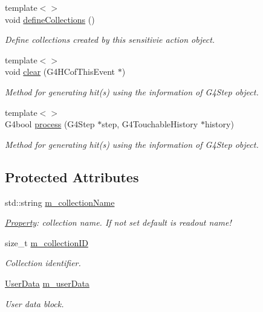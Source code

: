 \begin{DoxyCompactItemize}
{\footnotesize template$<$$>$ }\\void \hyperlink{class_d_d4hep_1_1_simulation_1_1_geant4_sensitive_action_af2a7d081e4173833bd77977cbc20ee0f}{define\+Collections} ()
\begin{DoxyCompactList}\small\item\em Define collections created by this sensitivie action object. \end{DoxyCompactList}\item 
{\footnotesize template$<$$>$ }\\void \hyperlink{class_d_d4hep_1_1_simulation_1_1_geant4_sensitive_action_a37038afed1f3cc353e9b16a264d505ec}{clear} (G4\+H\+Cof\+This\+Event $\ast$)
\begin{DoxyCompactList}\small\item\em Method for generating hit(s) using the information of G4\+Step object. \end{DoxyCompactList}\item 
{\footnotesize template$<$$>$ }\\G4bool \hyperlink{class_d_d4hep_1_1_simulation_1_1_geant4_sensitive_action_ad11ea4c3e4623fb5e2a8851d1aebb5c7}{process} (G4\+Step $\ast$step, G4\+Touchable\+History $\ast$history)
\begin{DoxyCompactList}\small\item\em Method for generating hit(s) using the information of G4\+Step object. \end{DoxyCompactList}\end{DoxyCompactItemize}
\subsection*{Protected Attributes}
\begin{DoxyCompactItemize}
\item 
std\+::string \hyperlink{class_d_d4hep_1_1_simulation_1_1_geant4_sensitive_action_a63934f5c71f72677f47b6666dbedba69}{m\+\_\+collection\+Name}
\begin{DoxyCompactList}\small\item\em \hyperlink{class_d_d4hep_1_1_property}{Property}\+: collection name. If not set default is readout name! \end{DoxyCompactList}\item 
size\+\_\+t \hyperlink{class_d_d4hep_1_1_simulation_1_1_geant4_sensitive_action_aa73c450b64116d4e52be7accbef7bea9}{m\+\_\+collection\+ID}
\begin{DoxyCompactList}\small\item\em Collection identifier. \end{DoxyCompactList}\item 
\hyperlink{class_d_d4hep_1_1_simulation_1_1_geant4_sensitive_action_a1aa349c02363cf7471a043ad5f3b95c9}{User\+Data} \hyperlink{class_d_d4hep_1_1_simulation_1_1_geant4_sensitive_action_a0e1c5a4683c5a4e50a0e3325b61f5275}{m\+\_\+user\+Data}
\begin{DoxyCompactList}\small\item\em User data block. \end{DoxyCompactList}\end{DoxyCompactItemize}

